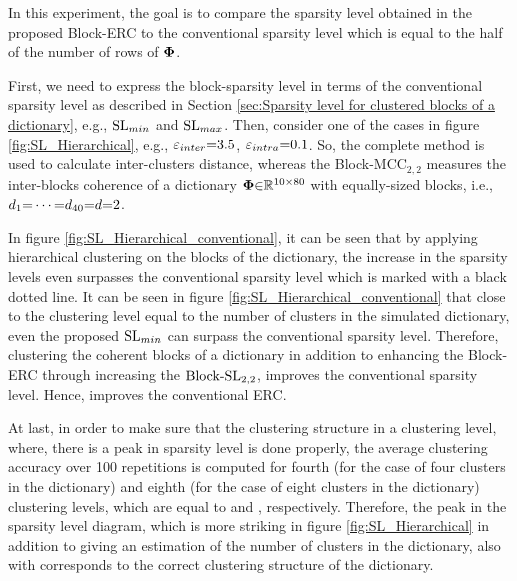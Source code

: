 In this experiment, the goal is to compare the sparsity level obtained in the proposed Block-ERC to the conventional sparsity level which is equal to the half of the number of rows of $\boldsymbol{\Phi}$.%

First, we need to express the block-sparsity level in terms of the conventional sparsity level as described in Section \ref{sec:Sparsity level for clustered blocks of a dictionary}, e.g., $\mathrm{SL}_{min}$ and $\mathrm{SL}_{max}$.
Then, consider one of the cases in figure \ref{fig:SL_Hierarchical}, e.g., $\varepsilon_{inter} {=} 3.5$, $\varepsilon_{intra} {=} 0.1$.
So, the complete method is used to calculate inter-clusters distance, whereas the Block-MCC$_{2,2}$ measures the inter-blocks coherence of a dictionary $\boldsymbol{\Phi} {\in} \mathbb{R}^{10 {\times} 80}$ with equally-sized blocks, i.e., $d_1 {=} \cdots {=} d_{40} {=} d {=} 2$.

In figure \ref{fig:SL_Hierarchical_conventional}, it can be seen that by applying hierarchical clustering on the blocks of the dictionary, the increase in the sparsity levels even surpasses the conventional sparsity level which is marked with a black dotted line.
It can be seen in figure \ref{fig:SL_Hierarchical_conventional} that close to the clustering level equal to the number of clusters in the simulated dictionary, even the proposed $\mathrm{SL}_{min}$ can surpass the conventional sparsity level.
Therefore, clustering the coherent blocks of a dictionary in addition to enhancing the Block-ERC through increasing the $\mathrm{Block\text{{-}}SL}_{2,2}$, improves the conventional sparsity level. 
Hence, improves the conventional ERC.

At last, in order to make sure that the clustering structure in a clustering level, where, there is a peak in sparsity level is done properly, the average clustering accuracy over 100 repetitions is computed for fourth (for the case of four clusters in the dictionary) and eighth (for the case of eight clusters in the dictionary) clustering levels, which are equal to  and , respectively.
Therefore, the peak in the sparsity level diagram, which is more striking in figure \ref{fig:SL_Hierarchical} in addition to giving an estimation of the number of clusters in the dictionary, also with  corresponds to the correct clustering structure of the dictionary.

\FloatBarrier